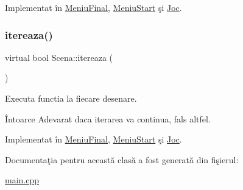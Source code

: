 Implementat în \hyperlink{classMeniuFinal_a72edd47d4783b321124d7d7af74b9ef8}{Meniu\+Final}, \hyperlink{classMeniuStart_a76d8d1b449800060994971ea9df75fd3}{Meniu\+Start} şi \hyperlink{classJoc_ac78ae0ddb45250af612eb68de253861e}{Joc}.

\mbox{\label{classScena_a9e5fcc831ed410b5b2422231ede746ee}} 
\subsubsection{\texorpdfstring{itereaza()}{itereaza()}}
{\footnotesize\ttfamily virtual bool Scena\+::itereaza (\begin{DoxyParamCaption}\item[{\hyperlink{classStadiulJocului}{Stadiul\+Jocului} \&}]{ }\end{DoxyParamCaption})\hspace{0.3cm}{\ttfamily [pure virtual]}}



Executa functia la fiecare \textquotesingle{}desenare\textquotesingle{}. 

\begin{DoxyReturn}{Întoarce}
Adevarat daca iterarea va continua, fals altfel. 
\end{DoxyReturn}


Implementat în \hyperlink{classMeniuFinal_a9ee1a22d9df62f0828961d38e05f8aa4}{Meniu\+Final}, \hyperlink{classMeniuStart_a35a84c537eca90b76697d1bef88216e5}{Meniu\+Start} şi \hyperlink{classJoc_a5b8d52f928137512921eee184ca04fec}{Joc}.



Documentaţia pentru această clasă a fost generată din fişierul\+:\begin{DoxyCompactItemize}
\item 
\hyperlink{main_8cpp}{main.\+cpp}\end{DoxyCompactItemize}
